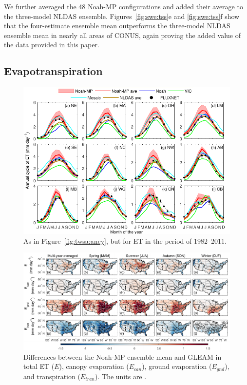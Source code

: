 \documentclass[essd, manuscript]{copernicus}
\let\unit\undefined
\begin{document}
We further averaged the 48 Noah-MP configurations and added their average to the three-model NLDAS ensemble. Figures~\ref{fig:swe:tss}e and \ref{fig:swe:tss}f show that the four-estimate ensemble mean outperforms the three-model NLDAS ensemble mean in nearly all areas of CONUS, again proving the added value of the data provided in this paper.


\subsection{Evapotranspiration}\label{sec:results:et}

\begin{figure}[t]
  \includegraphics[width=14cm]{fig/fig10.pdf}
  \caption{As in Figure~\ref{fig:twsa:ancy}, but for ET in the period of 1982--2011.}
  \label{fig:et:ancy}
\end{figure}

\begin{figure}[t]
  \includegraphics[width=17cm]{fig/fig11.pdf}
  \caption{Differences between the Noah-MP ensemble mean and GLEAM in total ET (\(E\)), canopy evaporation (\(E_{can}\)), ground evaporation (\(E_{gnd}\)), and transpiration (\(E_{tran}\)). The units are \unit{mm.day^{-1}}.}
  \label{fig:et:decomp}
\end{figure}
\end{document}
